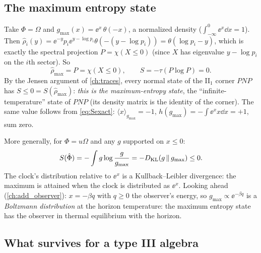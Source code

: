 \subsection{The maximum entropy state}

Take $\Phi=\Omega$ and $g_{\max}(x)=\ee^{x}\,\theta(-x)$, a normalized density ($\int_{-\infty}^0\ee^x\dd x=1$). Then $\hat\rho_i(y)=\ee^{-y}p_i\ee^{y-\log p_i}\theta(-(y-\log p_i))=\theta(\log p_i-y)$, which is exactly the spectral projection $P=\chi(X\le0)$ (since $X$ has eigenvalue $y-\log p_i$ on the $i$th sector). So
\begin{equation}
\hat\rho_{\max}=P=\chi(X\le0),\qquad S=-\tau(P\log P)=0.
\end{equation}
By the Jensen argument of \cref{ch:traces}, every normal state of the II$_1$ corner $PNP$ has $S\le0=S(\hat\rho_{\max})$: \emph{this is the maximum-entropy state}, the ``infinite-temperature'' state of $PNP$ (its density matrix is the identity of the corner). The same value follows from \eqref{eq:Sexact}: $\langle x\rangle_{g_{\max}}=-1$, $h(g_{\max})=-\int\ee^xx\dd x=+1$, sum zero.

More generally, for $\Phi=u\Omega$ and any $g$ supported on $x\le0$:
\begin{equation}
S(\hat\Phi)=-\int g\log\frac{g}{g_{\max}}=-D_{\rm KL}(g\,\|\,g_{\max})\le0.
\end{equation}
The clock's distribution relative to $\ee^{x}$ is a Kullback--Leibler divergence: the maximum is attained when the clock is distributed as $\ee^{x}$. Looking ahead (\cref{ch:add_observer}): $x=-\beta q$ with $q\ge0$ the observer's energy, so $g_{\max}\propto\ee^{-\beta q}$ is a \emph{Boltzmann distribution} at the horizon temperature: the maximum entropy state has the observer in thermal equilibrium with the horizon.

\subsection{What survives for a type III algebra}

